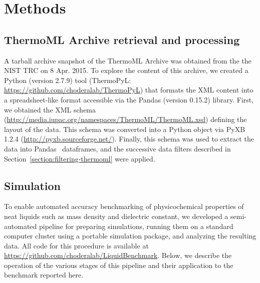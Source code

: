 \documentclass[aip, jcp, reprint]{revtex4-1}  %
\begin{document}

\section{Methods}
\label{section:methods}

\subsection{ThermoML Archive retrieval and processing}
\label{section:thermoml-archive-retrieval}


A tarball archive snapshot of the ThermoML Archive was obtained from the the NIST TRC on 8 Apr. 2015.
To explore the content of this archive, we created a Python (version 2.7.9) tool (ThermoPyL: \url{https://github.com/choderalab/ThermoPyL}) that formats the XML content into a spreadsheet-like format accessible via the Pandas (version 0.15.2) library.  
First, we obtained the XML schema (\url{http://media.iupac.org/namespaces/ThermoML/ThermoML.xsd}) defining the layout of the data.
This schema was converted into a Python object via PyXB 1.2.4 (\url{http://pyxb.sourceforge.net/}).
Finally, this schema was used to extract the data into Pandas~\cite{pandas} dataframes, and the successive data filters described in Section~\ref{section:filtering-thermoml} were applied.  

\subsection{Simulation}
\label{section:simulation}

To enable automated accuracy benchmarking of physicochemical properties of neat liquids such as mass density and dielectric constant, we developed a semi-automated pipeline for preparing simulations, running them on a standard computer cluster using a portable simulation package, and analyzing the resulting data.
All code for this procedure is available at  \url{https://github.com/choderalab/LiquidBenchmark}.
Below, we describe the operation of the various stages of this pipeline and their application to the benchmark reported here.
\end{document}
